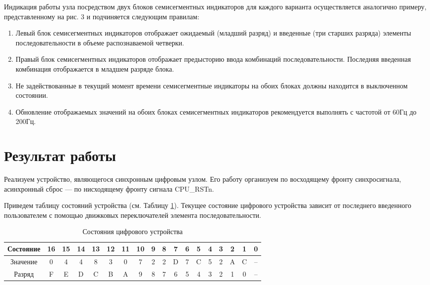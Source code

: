 \documentclass[a4paper,14pt]{extarticle}
\begin{document}
Индикация работы узла посредством двух блоков семисегментных индикаторов для
каждого варианта осуществляется аналогично примеру, представленному на рис. 3 и
подчиняется следующим правилам:
\begin{enumerate}
	\item Левый блок семисегментных индикаторов отображает ожидаемый (младший
	разряд) и введенные (три старших разряда) элементы последовательности в объеме
	распознаваемой четверки.
	\item  Правый блок семисегментных индикаторов отображает предысторию ввода
	комбинаций последовательности. Последняя введенная комбинация отображается в
	младшем разряде блока.
	\item  Не задействованные в текущий момент времени семисегментные индикаторы на
	обоих блоках должны находится в выключенном состоянии.
	\item Обновление отображаемых значений на обоих блоках семисегментных
	индикаторов рекомендуется выполнять с частотой от 60Гц до 200Гц.
\end{enumerate}


\section*{Результат работы}

Реализуем устройство, являющегося синхронным цифровым узлом. Его работу организуем по восходящему фронту синхросигнала, асинхронный сброс --- по нисходящему фронту сигнала CPU\_RSTn. 

Приведем таблицу состояний устройства (см. Таблицу \ref{tab:states}). Текущее состояние цифрового устройства зависит от последнего введенного пользователем с помощью движковых переключателей элемента последовательности. 

\begin{table}[htbp]
	\centering
	\caption{Состояния цифрового устройства}
	\begin{tabular}{|c|c|c|c|c|c|c|c|c|c|c|c|c|c|c|c|c|c|}
		\hline
		Состояние & 16& 15&	14	&13	&12&11&	10&	9&	8&	7&	6&	5&	4&	3&	2&	1&	0\\ \hline\hline
		Значение & 0 & 4 & 4 & 8 & 3 & 0 & 7 & 2 & 2 & D & 7 & C & 5 & 2 & A & C&-- \\ \hline\hline
		Разряд & F & E & D & C & B & A & 9 & 8 & 7 & 6 & 5 & 4 & 3 & 2 & 1 & 0 &--\\ \hline
	\end{tabular}

	\label{tab:states}
\end{table}
\end{document}
